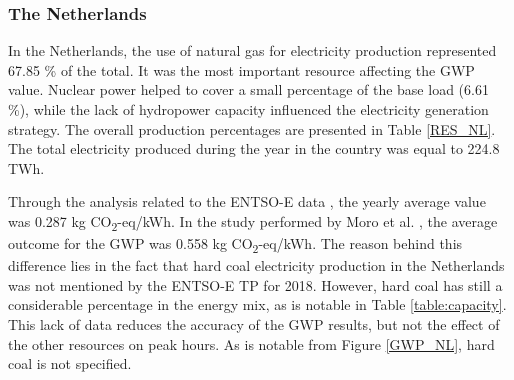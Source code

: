 {{\subsubsection{The Netherlands}

In the Netherlands, the use of natural gas for electricity production represented  67.85 \% of the total. It was the most important resource affecting the GWP value. Nuclear power helped to cover a small percentage of the base load {(6.61 \%)}, while the lack of hydropower capacity influenced the electricity generation strategy.  The overall production percentages are presented in Table \ref{RES_NL}.  The total electricity produced during the year in the country was equal to 224.8 TWh.

 \begin{table}[htbp]
\centering
\caption{Percentage of resources used during peak and off-peak hours in the Netherlands \cite{Entso-eProduction}.}
\label{RES_NL}
\end{table}

 Through the analysis related to the ENTSO-E data \cite{Entso-eProduction}, the yearly average value was 0.287 kg CO\textsubscript2-eq/kWh. In the study performed by Moro et al. \cite{Moro2017}, the average outcome for the GWP was 0.558 kg CO\textsubscript2-eq/kWh. The reason behind this difference lies in the fact that hard coal electricity production in the Netherlands was not mentioned by the ENTSO-E TP for 2018. However, hard coal has still a considerable percentage in the energy mix, as is notable in Table \ref{table:capacity}. This lack of data reduces the accuracy of the GWP results, but not the effect of the other resources on peak hours. As is notable from Figure \ref{GWP_NL}, hard coal is not specified.  
 
}}
